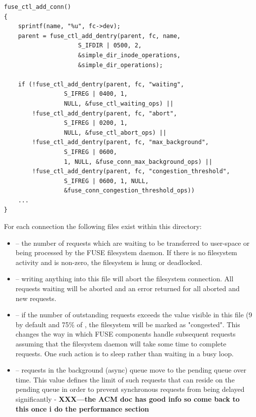 \begin{lstlisting}
fuse_ctl_add_conn() 
{
    sprintf(name, "%u", fc->dev);
    parent = fuse_ctl_add_dentry(parent, fc, name, 
                     S_IFDIR | 0500, 2,
                     &simple_dir_inode_operations,
                     &simple_dir_operations);

    if (!fuse_ctl_add_dentry(parent, fc, "waiting", 
                 S_IFREG | 0400, 1,
                 NULL, &fuse_ctl_waiting_ops) ||
        !fuse_ctl_add_dentry(parent, fc, "abort", 
                 S_IFREG | 0200, 1,
                 NULL, &fuse_ctl_abort_ops) ||
        !fuse_ctl_add_dentry(parent, fc, "max_background", 
                 S_IFREG | 0600,
                 1, NULL, &fuse_conn_max_background_ops) ||
        !fuse_ctl_add_dentry(parent, fc, "congestion_threshold",
                 S_IFREG | 0600, 1, NULL,
                 &fuse_conn_congestion_threshold_ops))
    ...
}
\end{lstlisting}

\noindent
For each connection the following files exist within this directory:

\begin{itemize}
	\item {} -- the number of requests which are waiting to be transferred to user-space or being processed by the
		FUSE filesystem daemon.  If there is no filesystem activity and  is non-zero, the filesystem is hung 
		or deadlocked.
	\item {} -- writing anything into this file will abort the filesystem connection. All requests waiting will be aborted and 
		an error returned for all aborted and new requests.
	\item {} -- if the number of outstanding requests exceeds the value visible in this file (9 by default
	 	and 75\% of , the filesystem will be marked as "congested". 
		This changes the way in which FUSE components handle subsequent requests assuming that the filesystem 
		daemon will take some time to complete requests. One such action is to sleep rather than waiting in a busy loop.
	\item {} -- requests in the background (async) queue move to the pending queue over time. This
		value defines the limit of such requests that can reside on the pending queue in order to prevent synchronous
		requests from being delayed significantly - \textbf{XXX---the ACM doc has good info so come back to this
		once i do the performance section}
\end{itemize}

